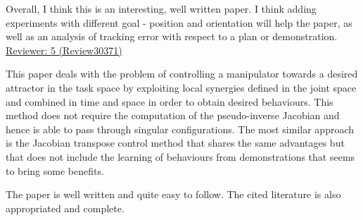 \documentclass[10pt,stdletter,dateno]{newlfm}
\begin{document}
\begin{newlfm}
\begin{enumerate}
\end{enumerate}

Overall, I think this is an interesting, well written paper. I think
adding experiments with different goal - position and orientation will
help the paper, as well as an analysis of tracking error with respect
to a plan or demonstration.\\


\underline{Reviewer: 5 (Review30371)}

This paper deals with the problem of controlling a manipulator towards
a desired attractor in the task space by exploiting local synergies
defined in the joint space and combined in time and space in order to
obtain desired behaviours. This method does not require the computation
of the pseudo-inverse Jacobian and hence is able to pass through
singular configurations. The most similar approach is the Jacobian
transpose control method that shares the same advantages but that does
not include the learning of behaviours from demonstrations that seems
to bring some benefits. 

The paper is well written and quite easy to follow. The cited
literature is also appropriated and complete. 


\end{newlfm}
\end{document}
